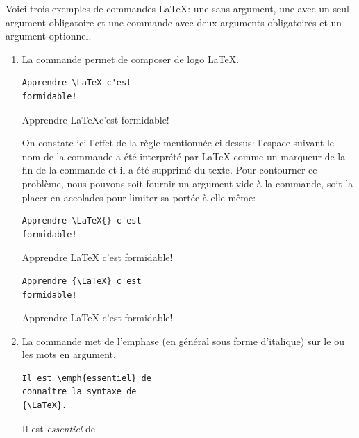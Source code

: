 \begin{exemple}
  \label{exemple:base:commandes}
  Voici trois exemples de commandes {\LaTeX}: une sans argument, une
  avec un seul argument obligatoire et une commande avec deux
  arguments obligatoires et un argument optionnel.
  \begin{enumerate}
  \item La commande \cmd{\LaTeX} permet de composer de logo {\LaTeX}.
    \begin{demo}
      \begin{texample}
\begin{lstlisting}
Apprendre \LaTeX c'est
formidable!
\end{lstlisting}
        \producing
        Apprendre \LaTeX c'est
        formidable!
      \end{texample}
    \end{demo}
    On constate ici l'effet de la règle mentionnée ci-dessus:
    l'espace suivant le nom de la commande a été interprété par
    {\LaTeX} comme un marqueur de la fin de la commande et il a été
    supprimé du texte. Pour contourner ce problème, nous pouvons soit
    fournir un argument vide à la commande, soit la placer en
    accolades pour limiter sa portée à elle-même:
    \begin{demo}
      \begin{texample}
\begin{lstlisting}
Apprendre \LaTeX{} c'est
formidable!
\end{lstlisting}
        \producing
        Apprendre \LaTeX{} c'est
        formidable!
      \end{texample}
      \begin{texample}
\begin{lstlisting}
Apprendre {\LaTeX} c'est
formidable!
\end{lstlisting}
        \producing
        Apprendre {\LaTeX} c'est
        formidable!
      \end{texample}
    \end{demo}
  \item La commande \cmd{\emph} met de l'emphase (en général sous
    forme d'italique) sur le ou les mots en argument.
    \begin{demo}
      \begin{texample}
\begin{lstlisting}
Il est \emph{essentiel} de
connaître la syntaxe de
{\LaTeX}.
\end{lstlisting}
        \producing
        Il est \emph{essentiel} de

\end{texample}
\end{demo}
\end{enumerate}
\end{exemple}
